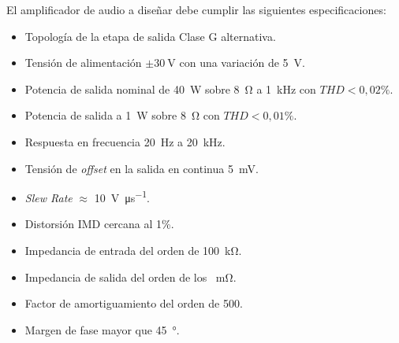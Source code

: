 El amplificador de audio a diseñar debe cumplir las siguientes especificaciones:

\begin{itemize}
	\item Topología de la etapa de salida Clase G alternativa.
	\item Tensión de alimentación $\pm \SI{30}{\volt}$ con una variación de \SI{5}{\volt}.
	\item Potencia de salida nominal de \SI{40}{\watt} sobre \SI{8}{\ohm} a \SI{1}{\kilo\hertz} con $THD<0,02\%$.
	\item Potencia de salida a \SI{1}{\watt} sobre \SI{8}{\ohm} con $THD<0,01\%$. 
	\item Respuesta en frecuencia \SI{20}{\hertz} a \SI{20}{\kilo\hertz}.
	\item Tensión de \textit{offset} en la salida en continua \SI{5}{\milli\volt}.
	\item \textit{Slew Rate} $\approx$ \SI{10}{\volt\per\micro\second}.
	\item Distorsión IMD cercana al 1\%.
	\item Impedancia de entrada del orden de \SI{100}{\kilo\ohm}.
	\item Impedancia de salida del orden de los \SI{}{\milli\ohm}.
	\item Factor de amortiguamiento del orden de 500.
	\item Margen de fase mayor que \SI{45}{\degree}.
\end{itemize}


